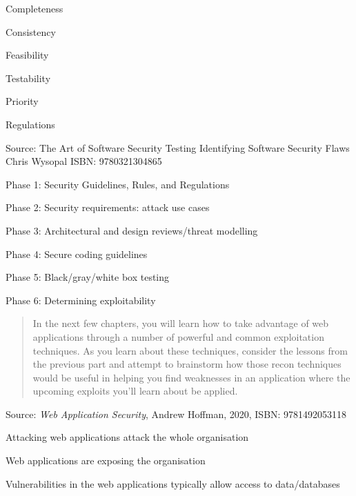 \documentclass[Screen16to9,17pt]{foils}
\begin{document}
\begin{list2}
\item Completeness
\item Consistency
\item Feasibility
\item Testability
\item Priority
\item Regulations
\end{list2}

Source: The Art of Software Security Testing Identifying Software Security Flaws
Chris Wysopal ISBN: 9780321304865


\begin{list2}
\item Phase 1: Security Guidelines, Rules, and Regulations
\item Phase 2: Security requirements: attack use cases
\item Phase 3: Architectural and design reviews/threat modelling
\item Phase 4: Secure coding guidelines
\item Phase 5: Black/gray/white box testing
\item Phase 6: Determining exploitability
\end{list2}






\begin{quote}
  In the next few chapters, you will learn how to take advantage of web applications
  through a number of powerful and common exploitation techniques. As you learn
  about these techniques, consider the lessons from the previous part and attempt to
  brainstorm how those recon techniques would be useful in helping you find weaknesses in an application where the upcoming exploits you’ll learn about be applied.
\end{quote}
Source: \emph{Web Application Security}, Andrew Hoffman, 2020, ISBN: 9781492053118

\begin{list2}
\item Attacking web applications attack the whole organisation
\item Web applications are exposing the organisation
\item Vulnerabilities in the web applications typically allow access to data/databases
\end{list2}
\end{document}
